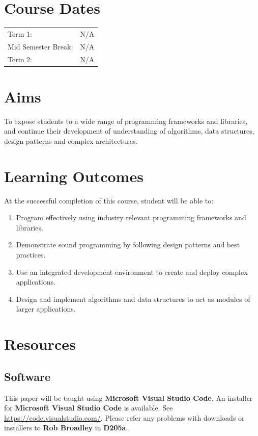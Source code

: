 \documentclass{article}
\begin{document}
\section*{Course Dates}
\begin{tabular}{ll}
  Term 1:             & N/A \\
  Mid Semester Break: & N/A \\
  Term 2:             & N/A \\
\end{tabular}

\section*{Aims}
To expose students to a wide range of programming frameworks and libraries, and continue their development of understanding of algorithms, data structures, design patterns and complex architectures.

\section*{Learning Outcomes}
At the successful completion of this course, student will be able to:
\begin{enumerate}
  \item Program effectively using industry relevant programming frameworks and libraries.
  \item Demonstrate sound programming by following design patterns and best practices.
  \item Use an integrated development environment to create and deploy complex applications.
  \item Design and implement algorithms and data structures to act as modules of larger applications.
\end{enumerate}

\section*{Resources}

\subsection*{Software}
This paper will be taught using \textbf{Microsoft Visual Studio Code}. An installer for \textbf{Microsoft Visual Studio Code} is available. See \href{https://code.visualstudio.com/}{https://code.visualstudio.com/}. Please refer any problems with downloads or installers to \textbf{Rob Broadley} in \textbf{D205a}.
\end{document}
